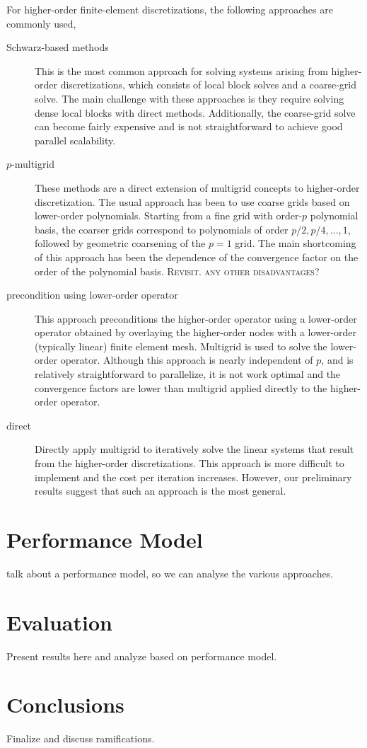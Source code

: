 \documentclass[times]{nlaauth}
\begin{document}
For higher-order finite-element discretizations, the following
approaches are commonly used,
\begin{description}

	\item[Schwarz-based methods] This is the most common approach for
	solving systems arising from higher-order discretizations, which
	consists of local block solves and a coarse-grid solve. The main
	challenge with these approaches is they require solving dense local
	blocks with direct methods. Additionally, the coarse-grid solve can
	become fairly expensive and is not straightforward to achieve good
	parallel scalability. 

 \item[$p$-multigrid] These methods are a direct extension of
	multigrid concepts to higher-order discretization. The usual
	approach has been to use coarse grids based on lower-order
	polynomials. Starting from a fine grid with order-$p$ polynomial
	basis, the coarser grids correspond to polynomials of order $p/2,
	p/4,\ldots,1$, followed by geometric coarsening of the $p=1$
	grid. The main shortcoming of this approach has been the dependence
	of the convergence factor on the order of the polynomial
	basis. \textsc{Revisit. any other disadvantages}?

\item[precondition using lower-order operator] This
	approach preconditions the higher-order operator using a lower-order
	operator obtained by overlaying the higher-order nodes with a
	lower-order (typically linear) finite element mesh. Multigrid is
	used to solve the lower-order operator. Although this approach is
	nearly independent of $p$, and is relatively straightforward to
	parallelize, it is not work optimal and the convergence factors are
	lower than multigrid applied directly to the higher-order
	operator.  

\item[direct] Directly apply multigrid to iteratively
	solve the linear systems that result from the higher-order
	discretizations. This approach is more difficult to implement and
	the cost per iteration increases. However, our preliminary results
	suggest that such an approach is the most general.
\end{description} 



\section{Performance Model}

talk about a performance model, so we can analyse the various approaches.

\section{Evaluation}

Present results here and analyze based on performance model.



\section{Conclusions}

Finalize and discuss ramifications.




\end{document}
